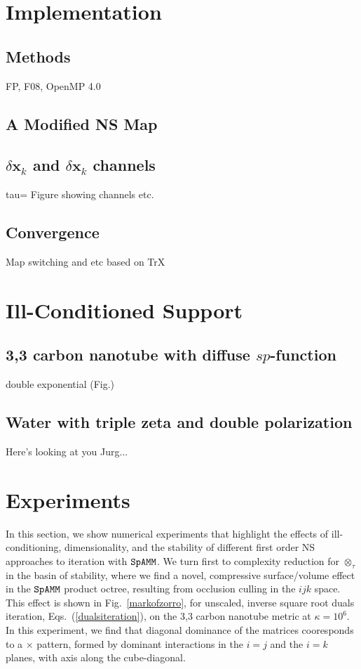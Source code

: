 \documentclass[letterpaper,twocolumn,amsmath,amsfont,amssymb,english,aps,jcp,preprintnumbers,groupaddress,nofootinbib,tightenlines]{revtex4}
\newcommand{\mat}[1]{\boldsymbol{#1}}
\newcommand{\ot}{ {\scriptstyle \otimes}_{ \tau } }
\begin{document}
\section{Implementation}

\subsection{Methods}
FP, F08, OpenMP 4.0

\subsection{A Modified NS Map}

\subsection{$\delta \mat{x}_k$ and $\delta \mat{x}_k$ channels}
tau= Figure showing channels etc.  

\subsection{Convergence}
Map switching and etc based on TrX


\section{Ill-Conditioned Support}

\subsection{ 3,3 carbon nanotube with diffuse $sp$-function}
double exponential (Fig.)

\subsection{Water with triple zeta and double polarization}
Here's looking at you Jurg...

\section{Experiments}

In this section, we show  numerical experiments that highlight the effects of 
ill-conditioning, dimensionality, and the stability of different first order NS approaches to iteration with $\tt SpAMM$. 
We turn first to complexity reduction for $\ot$ in the basin of stability,  where we find a novel, compressive 
surface/volume effect in the $\tt SpAMM$ product octree, resulting from occlusion culling in the $ijk$ space.
This effect is shown in Fig.~\ref{markofzorro},  for unscaled, inverse square root duals iteration, 
Eqs.~(\ref{dualsiteration}), on the 3,3 carbon nanotube metric at $\kappa=10^6$. 
In this experiment, we find that diagonal dominance of the matrices cooresponds to a 
$\times$ pattern, formed by dominant interactions in the $i=j$ and the $i=k$ planes, with axis 
along the cube-diagonal.  
\end{document}
